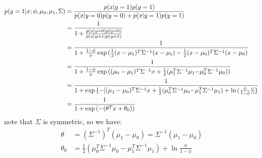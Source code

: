 \begin{answer}
    $$
    \begin{aligned}
        p(y=1|x;\phi,\mu_0,\mu_1,\Sigma) &= \frac{p(x|y=1)p(y=1)}{p(x|y=0)p(y=0)+p(x|y=1)p(y=1)} \\
        &= \frac{1}{1+\frac{p(x|y=0)p(y=0)}{p(x|y=1)p(y=1)}} \\
        &= \frac{1}{1+\frac{1-\phi}{\phi}\exp{(\frac{1}{2}(x-\mu_1)^T\Sigma^{-1}(x-\mu_1) - \frac{1}{2}(x-\mu_0)^T\Sigma^{-1}(x-\mu_0)}} \\
        &=\frac{1}{1+\frac{1-\phi}{\phi}\exp{((\mu_0-\mu_1)^T\Sigma^{-1}x+\frac{1}{2}(\mu_1^T\Sigma^{-1}\mu_1 - }\mu_0^T\Sigma^{-1}\mu_0))}\\
        &=\frac{1}{1+\exp{\{-[(\mu_1-\mu_0)^T\Sigma^{-1}x+\frac{1}{2}(\mu_0^T\Sigma^{-1}\mu_0 - }\mu_1^T\Sigma^{-1}\mu_1)+\ln{(\frac{\phi}{1-\phi})}]\}}\\
        &=\frac{1}{1+\exp{(-(\theta^Tx+\theta_0))}}
        \end{aligned}\\
    $$
    note that $\Sigma$ is symmetric, so we have:
    $$
        \begin{aligned}
        \theta &= (\Sigma^{-1})^T(\mu_1-\mu_0) = \Sigma^{-1}(\mu_1-\mu_0)\\ 
        \theta_0 &=\frac{1}{2}(\mu_0^T\Sigma^{-1}\mu_0-\mu_1^T\Sigma^{-1}\mu_1)+\ln{\frac{\phi}{1-\phi}}
        \end{aligned}
    $$

\end{answer}
